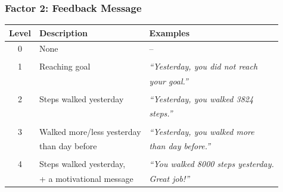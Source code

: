 \documentclass[10pt,xcolor=dvipsnames]{beamer}
\begin{document}
\begin{frame}[plain]
\frametitle{Factor 2: Feedback Message}
\begin{center}
\begin{tabular}{c|l|l}
\hline
Level & Description & Examples \\
\hline
0 & None & -- \\
& & \\
1 & Reaching goal & {\em ``Yesterday, you did not reach}  \\
& & {\em your goal.''} \\
& & \\
2 & Steps walked yesterday & {\em ``Yesterday, you walked 3824}  \\
& & {\em steps.''} \\
& & \\
3 & Walked more/less yesterday & {\em ``Yesterday, you walked more} \\
& than day before & {\em than day before.''} \\
& & \\
4 & Steps walked yesterday,  &  {\em ``You walked 8000 steps yesterday.}  \\
& + a motivational message &  {\em Great job!''} \\
\hline
\end{tabular}
\end{center}


\end{frame}
\end{document}
